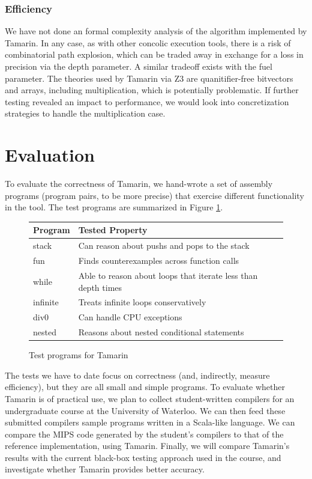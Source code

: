\documentclass{llncs}
\begin{document}
\subsubsection{Efficiency}

We have not done an formal complexity analysis of the algorithm implemented by Tamarin. In any case, as with other concolic execution tools, there is a risk of combinatorial path explosion, which can be traded away in exchange for a loss in precision via the \textsf{depth} parameter. A similar tradeoff exists with the \textsf{fuel} parameter. The theories used by Tamarin via Z3 are quanitifier-free bitvectors and arrays, including multiplication, which is potentially problematic. If further testing revealed an impact to performance, we would look into concretization strategies to handle the multiplication case.

\section{Evaluation}
\label{evalsect}

To evaluate the correctness of Tamarin, we hand-wrote a set of assembly programs (program pairs, to be more precise) that exercise different functionality in the tool. The test programs are summarized in Figure \ref{testtable}.

\begin{figure}
\begin{tabular}{l | l}
\textbf{Program} & \textbf{Tested Property} \\
\hline
\textsf{stack} & Can reason about pushs and pops to the stack \\
\textsf{fun} & Finds counterexamples  across function calls \\
\textsf{while} & Able to reason about loops that iterate less than \textsf{depth} times \\
\textsf{infinite} & Treats infinite loops conservatively \\
\textsf{div0} & Can handle CPU exceptions \\
\textsf{nested} & Reasons about nested conditional statements
\end{tabular}
\caption{Test programs for Tamarin}
\label{testtable}
\end{figure}

The tests we have to date focus on correctness (and, indirectly, measure efficiency), but they are all small and simple programs. To evaluate whether Tamarin is of practical use, we plan to collect student-written compilers for an undergraduate course at the University of Waterloo. We can then feed these submitted compilers sample programs written in a Scala-like language. We can compare the MIPS code generated by the student's compilers to that of the reference implementation, using Tamarin. Finally, we will compare Tamarin's results with the current black-box testing approach used in the course, and investigate whether Tamarin provides better accuracy.
\end{document}
